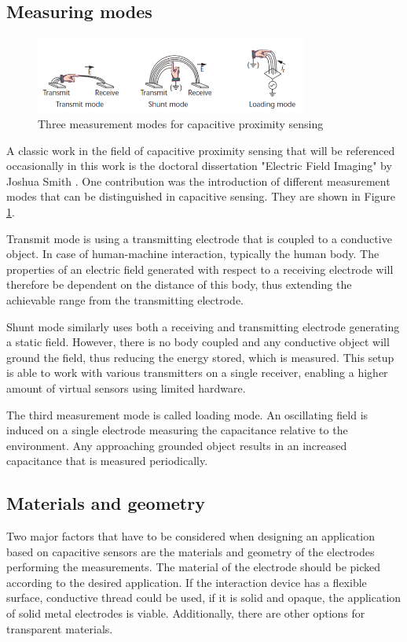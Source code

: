\subsection{Measuring modes}
\begin{figure} [h]
\centering
\includegraphics[width=0.8\textwidth]{images/cap_sensing_modes.png} 
\caption{Three measurement modes for capacitive proximity sensing \cite{Smith1996a}}
\label{fig:cap_sensing_modes}
\end{figure}
A classic work in the field of capacitive proximity sensing that will be referenced occasionally in this work is the doctoral dissertation "Electric Field Imaging" by Joshua Smith \cite{smith1999thesis}. One contribution was the introduction of different measurement modes that can be distinguished in capacitive sensing. They are shown in Figure \ref{fig:cap_sensing_modes}. 

Transmit mode is using a transmitting electrode that is coupled to a conductive object. In case of human-machine interaction, typically the human body. The properties of an electric field generated with respect to a receiving electrode will therefore be dependent on the distance of this body, thus extending the achievable range from the transmitting electrode.

Shunt mode similarly uses both a receiving and transmitting electrode generating a static field. However, there is no body coupled and any conductive object will ground the field, thus reducing the energy stored, which is measured. This setup is able to work with various transmitters on a single receiver, enabling a higher amount of virtual sensors using limited hardware. 

The third measurement mode is called loading mode. An oscillating field is induced on a single electrode measuring the capacitance relative to the environment. Any approaching grounded object results in an increased capacitance that is measured periodically.

\subsection{Materials and geometry}
Two major factors that have to be considered when designing an application based on capacitive sensors are the materials and geometry of the electrodes performing the measurements. The material of the electrode should be picked according to the desired application. If the interaction device has a flexible surface, conductive thread could be used, if it is solid and opaque, the application of solid metal electrodes is viable. Additionally, there are other options for transparent materials. 

